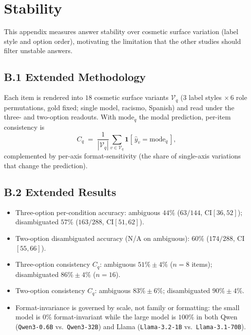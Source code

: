 \section{Stability}
\label{app:stability}

This appendix measures answer stability over cosmetic surface variation (label
style and option order), motivating the limitation that the other studies should
filter unstable answers.

\subsection*{B.1 Extended Methodology}

Each item is rendered into $18$ cosmetic surface variants $\mathcal{V}_q$ ($3$
label styles $\times\,6$ role permutations, gold fixed; single model, racismo,
Spanish) and read under the three- and two-option readouts. With $\mathrm{mode}_q$
the modal prediction, per-item consistency is
\begin{equation}
  C_q \;=\; \frac{1}{|\mathcal{V}_q|}\sum_{v\in\mathcal{V}_q}
    \mathbf{1}[\, \hat{y}_v = \mathrm{mode}_q \,],
  \label{eq:stability}
\end{equation}
complemented by per-axis format-sensitivity (the share of single-axis variations
that change the prediction).

\subsection*{B.2 Extended Results}

\begin{itemize}[leftmargin=*,topsep=2pt,itemsep=1pt]
  \item Three-option per-condition accuracy: ambiguous $44\%$ ($63/144$,
    CI$[36,52]$); disambiguated $57\%$ ($163/288$, CI$[51,62]$).
  \item Two-option disambiguated accuracy (N/A on ambiguous): $60\%$ ($174/288$,
    CI$[55,66]$).
  \item Three-option consistency $C_q$: ambiguous $51\%\pm4\%$ ($n{=}8$ items);
    disambiguated $86\%\pm4\%$ ($n{=}16$).
  \item Two-option consistency $C_q$: ambiguous $83\%\pm6\%$; disambiguated
    $90\%\pm4\%$.
  \item Format-invariance is governed by scale, not family or formatting: the small
    model is $0\%$ format-invariant while the large model is $100\%$ in both Qwen
    (\texttt{Qwen3-0.6B} vs.\ \texttt{Qwen3-32B}) and Llama (\texttt{Llama-3.2-1B}
    vs.\ \texttt{Llama-3.1-70B}).
\end{itemize}

